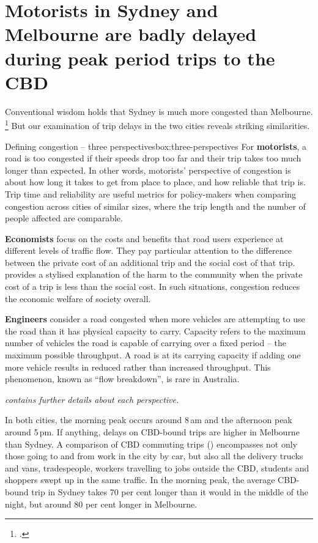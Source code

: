 \documentclass{grattan}
\begin{document}
\section{Motorists in Sydney and Melbourne are badly delayed during peak period trips to the CBD}\label{subsec:benchmarking-against-other-cities}

Conventional wisdom holds that Sydney is much more congested than Melbourne.
    \footcite{OSullivan-2017-Sydney-is-congestion-capital-of-Australasia}
But our examination of trip delays in the two cities reveals striking similarities.

\begin{verysmallbox}[!hp]{Defining congestion -- three perspectives}{box:three-perspectives}
For \textbf{motorists}, a road is too congested if their speeds drop too far and their trip takes too much longer than expected.
In other words, motorists' perspective of congestion is about how long it takes to get from place to place, and how reliable that trip is.
Trip time and reliability are useful metrics for policy-makers when comparing congestion across cities of similar sizes, where the trip length and the number of people affected are comparable.

\textbf{Economists} focus on the costs and benefits that road users experience at different levels of traffic flow.
They pay particular attention to the difference between the private cost of an additional trip and the social cost of that trip.
 provides a stylised explanation of the harm to the community when the private cost of a trip is less than the social cost. In such situations, congestion reduces the economic welfare of society overall.

\textbf{Engineers}
consider a road congested when more vehicles are attempting to use the road than it has physical capacity to carry.
Capacity refers to the maximum number of vehicles the road is capable of carrying over a fixed period – the maximum possible throughput.
A road is at its carrying capacity if adding one more vehicle results in reduced rather than increased throughput.
This phenomenon, known as ``flow breakdown'', is rare in Australia.

{\footnotesize\itshape {} contains further details about each perspective.}
\end{verysmallbox}


In both cities, the morning peak occurs around 8\,am and the afternoon peak around 5\,pm.
If anything, delays on CBD-bound trips are higher in Melbourne than Sydney.
A comparison of CBD commuting trips () encompasses not only those going to and from work in the city by car, but also all the delivery trucks and vans, tradespeople, workers travelling to jobs outside the CBD, students and shoppers swept up in the same traffic.
In the morning peak, the average CBD-bound trip in Sydney takes 70 per cent longer than it would in the middle of the night, but around 80 per cent longer in Melbourne.
\end{document}
